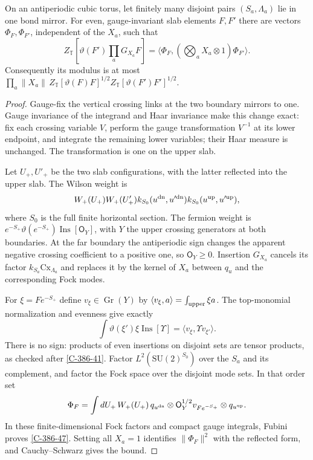 \documentclass[11pt,letterpaper,reqno]{amsart}
\makeatletter
\theoremstyle{definition}
\newcommand{\ms@minorstart}{%
  \pushQED{\qed}\renewcommand{\qedsymbol}{$\blacksquare$}}
\newenvironment{lemma}[1][]{\ms@minorstart\ms@lemma[#1]}
  {\popQED\endms@lemma}
\theoremstyle{remark}
\makeatother
\begin{document}
\begin{lemma}[The operator in the mirror]\label{C-386-46}
On an antiperiodic cubic torus, let finitely many disjoint pairs
$(S_a,\Lambda_a)$ lie in one bond mirror. For even, gauge-invariant
slab elements $F,F'$ there are vectors $\Phi_F,\Phi_{F'}$,
independent of the $X_a$, such that
\begin{equation}\label{C-386-47}
 Z_{\mathbb T}\left[\vartheta(F')\prod_aG_{X_a}F\right]
       =\langle\Phi_F,(\bigotimes_aX_a\otimes1)\Phi_{F'}\rangle.
\end{equation}
Consequently its modulus is at most
$\prod_a\|X_a\|\,Z_{\mathbb T}[\vartheta(F)F]^{1/2}
Z_{\mathbb T}[\vartheta(F')F']^{1/2}$.
\end{lemma}

\begin{proof}
Gauge-fix the vertical crossing links at the two boundary mirrors
to one. Gauge invariance of the integrand and Haar invariance make
this change exact: fix each crossing variable $V$, perform the
gauge transformation $V^{-1}$ at its lower endpoint, and integrate
the remaining lower variables; their Haar measure is unchanged.
The transformation is one on the upper slab.

Let $U_+,U'_+$ be the two slab configurations, with the latter
reflected into the upper slab. The Wilson weight is
\[
 W_+(U_+)W_+(U'_+)
 k_{S_0}(u^{\rm dn},u'^{\rm dn})
 k_{S_0}(u^{\rm up},u'^{\rm up}),
\]
where $S_0$ is the full finite horizontal section. The fermion
weight is $e^{-S_+}\vartheta(e^{-S_+})\operatorname{Ins}[\mathsf O_Y]$,
with $Y$ the upper crossing generators at both boundaries.
At the far boundary the antiperiodic sign changes the apparent
negative crossing coefficient to a positive one, so
$\mathsf O_Y\ge0$. Insertion $G_{X_a}$ cancels its factor
$k_{S_a}\mathrm{Cx}_{\Lambda_a}$ and replaces it by the kernel
of $X_a$ between $q_u$ and the corresponding Fock modes.

For $\xi=Fe^{-S_+}$ define $v_\xi\in\operatorname{Gr}(Y)$ by
$\langle v_\xi,a\rangle=\int_{\rm upper}\xi a$.
The top-monomial normalization and evenness give exactly
\[
 \int\vartheta(\xi')\xi\operatorname{Ins}[\Upsilon]
                =\langle v_\xi,\Upsilon v_{\xi'}\rangle.
\]
There is no sign: products of even insertions on disjoint sets
are tensor products, as checked after \eqref{C-386-41}.
Factor $L^2(\mathrm{SU}(2)^{S_0})$ over the $S_a$ and its
complement, and factor the Fock space over the disjoint mode sets.
In that order set
\[
 \Phi_F=\int dU_+\,W_+(U_+)\,
        q_{u^{\rm dn}}\otimes\mathsf O_Y^{1/2}v_{Fe^{-S_+}}
                                      \otimes q_{u^{\rm up}}.
\]
In these finite-dimensional Fock factors and compact gauge
integrals, Fubini proves \eqref{C-386-47}. Setting all $X_a=1$
identifies $\|\Phi_F\|^2$ with the reflected form, and
Cauchy--Schwarz gives the bound.
\end{proof}
\end{document}
